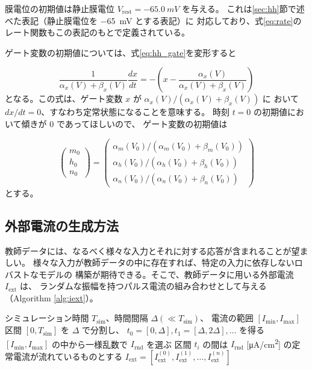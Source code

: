 \documentclass[a4paper,11pt,openany]{ltjsreport}
\newcommand{\Iext}{I_{\mathrm{ext}}}
\begin{document}
膜電位の初期値は静止膜電位 $V_{\mathrm{rest}} = \SI{-65.0}{mV}$ を与える。
これは\ref{sec:hh}節で述べた表記（静止膜電位を \SI{-65}{mV} とする表記）に
対応しており、式\eqref{eq:rate}のレート関数もこの表記のもとで定義されている。

ゲート変数の初期値については、式\eqref{eq:hh_gate}を変形すると

\begin{equation}
  \frac{1}{\alpha_x(V) + \beta_x(V)} \frac{dx}{dt}
    = -\left( x - \frac{\alpha_x(V)}{\alpha_x(V) + \beta_x(V)} \right)
  \label{eq:gate_relax}
\end{equation}
となる。この式は、ゲート変数 $x$ が $\alpha_x(V) / (\alpha_x(V) + \beta_x(V))$ に
おいて $dx/dt = 0$、すなわち定常状態になることを意味する。
時刻 $t=0$ の初期値において傾きが $0$ であってほしいので、
ゲート変数の初期値は

\begin{equation}
  \begin{pmatrix} m_0 \\ h_0 \\ n_0 \end{pmatrix}
  = \begin{pmatrix}
      \alpha_m(V_0) / (\alpha_m(V_0) + \beta_m(V_0)) \\
      \alpha_h(V_0) / (\alpha_h(V_0) + \beta_h(V_0)) \\
      \alpha_n(V_0) / (\alpha_n(V_0) + \beta_n(V_0))
    \end{pmatrix}
  \label{eq:gate_init}
\end{equation}
とする。

\subsection{外部電流の生成方法}

教師データには、なるべく様々な入力とそれに対する応答が含まれることが望ましい。
様々な入力が教師データの中に存在すれば、特定の入力に依存しないロバストなモデルの
構築が期待できる。そこで、教師データに用いる外部電流 $\Iext$ は、
ランダムな振幅を持つパルス電流の組み合わせとして与える
（Algorithm \ref{alg:iext}）。

\begin{algorithm}[tbp]
  \caption{$\Iext$ の決定}
  \label{alg:iext}
  \begin{algorithmic}[1]
    \Require シミュレーション時間 $T_{\mathrm{sim}}$、時間間隔 $\Delta (\ll T_{\mathrm{sim}})$、
             電流の範囲 $[I_{\min}, I_{\max}]$
    \State 区間 $[0, T_{\mathrm{sim}}]$ を $\Delta$ で分割し、
           $t_0 = [0,\Delta], t_1 = [\Delta, 2\Delta], \dots$ を得る
      \State $[I_{\min}, I_{\max}]$ の中から一様乱数で $I_{\mathrm{rnd}}$ を選ぶ
      \State 区間 $t_i$ の間は $I_{\mathrm{rnd}}$ [\si{\micro A/cm^2}] の定常電流が流れているものとする
    \EndFor
    \State \Return $\Iext = [\Iext^{(0)}, \Iext^{(1)}, \dots, \Iext^{(n)}]$
  \end{algorithmic}
\end{algorithm}
\end{document}
